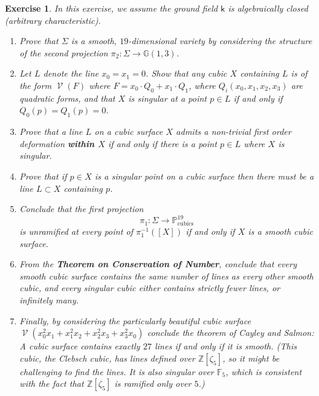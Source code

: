 \documentclass[11pt]{article}
\renewcommand{\P}{\mathbb{P}}
\renewcommand{\Z}{\mathbb{Z}}
\newcommand{\G}{\mathbb{G}}
\renewcommand{\k}{\mathsf{k}}
\renewcommand{\to}{\longrightarrow}
\DeclareMathOperator{\V}{\mathcal{V}}
\DeclareMathOperator{\cubics}{\textrm{cubics}}
\renewcommand{\k}{\mathsf{k}}
\renewcommand{\P}{\mathbb P}
\newcommand{\G}{\mathbb G}
\renewcommand{\to}{{\longrightarrow}}
\newtheorem{exercise}{Exercise}[section]
\begin{document}
\begin{exercise}
In this exercise, we assume the ground field \(\k\) is algebraically closed (arbitrary characteristic). 
\begin{enumerate}
\item Prove that \(\Sigma\) is a smooth, \(19\)-dimensional variety by considering the structure of the second projection \(\pi_2:\Sigma \to \G(1,3)\).
\item Let \(L\) denote the line \(x_0 = x_1 = 0\).  Show that any cubic \(X\) containing \(L\) is of the form \(\V(F)\) where \(F = x_0 \cdot Q_0 + x_1 \cdot Q_1\), where \(Q_i(x_0,x_1,x_2,x_3)\) are quadratic forms, and that \(X\) is singular at a point \(p \in L\) if and only if \(Q_0(p) = Q_1 (p) = 0\).
\item Prove that a line \(L\) on a cubic surface \(X\) admits a non-trivial first order deformation \textbf{\emph{within \(X\)}} if and only if there is a point \(p \in L\) where \(X\) is singular.
\item Prove that if \(p \in X\) is a singular point on a cubic surface then there must be a line \(L \subset X\) containing \(p\).
\item Conclude that the first projection \[\pi_{1}: \Sigma \to \P_{\cubics}^{19}\] is unramified at every point of \(\pi_{1}^{-1}([X])\) if and only if \(X\) is a smooth cubic surface.
\item From the \textbf{\emph{Theorem on Conservation of Number}}, conclude that \emph{every smooth cubic surface contains the same number of lines as every other smooth cubic, and every singular cubic either contains strictly fewer lines, or infinitely many.}
\item Finally, by considering the particularly beautiful  cubic surface \(\V(x_{0}^2x_{1} + x_{1}^2x_{2} + x_{2}^{2}x_{3}+ x_{3}^{2}x_{0})\) conclude the theorem of Cayley and Salmon: \emph{A cubic surface contains exactly \(27\) lines if and only if it is smooth.} (This cubic, the Clebsch cubic, has lines defined over \(\Z[\zeta_{5}]\), so it might be challenging to find the lines. It is also singular over \(\mathbb{F}_{5}\), which is consistent with the fact that \(\Z[\zeta_{5}]\) is ramified only over \(5\).)
\end{enumerate}
\end{exercise}
\end{document}
